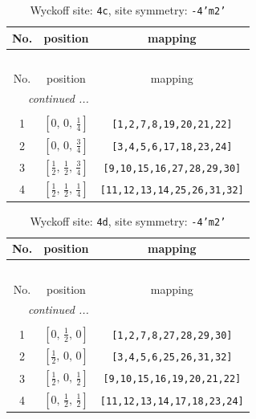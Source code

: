 \documentclass[fleqn,8pt]{jsarticle}
\begin{document}
\renewcommand{\arraystretch}{1.2}
\begin{longtable}{ccc}
\caption{Wyckoff site: {\tt 4c}, site symmetry: {\tt -4'm2'}}
 \\
 \hline \hline
No. & position & mapping \\ \hline \endfirsthead

\multicolumn{2}{l}{\tablename\ \thetable{}} \\
 \hline \hline
No. & position & mapping \\ \hline \endhead

 \hline \hline
\multicolumn{2}{r}{\footnotesize\it continued ...} \\ \endfoot

 \hline \hline
\multicolumn{2}{r}{} \\ \endlastfoot

1 & $\left[ 0,\, 0,\, \frac{1}{4} \right]$ & {\tt [1,2,7,8,19,20,21,22]} \\ \hline
2 & $\left[ 0,\, 0,\, \frac{3}{4} \right]$ & {\tt [3,4,5,6,17,18,23,24]} \\ \hline
3 & $\left[ \frac{1}{2},\, \frac{1}{2},\, \frac{3}{4} \right]$ & {\tt [9,10,15,16,27,28,29,30]} \\ \hline
4 & $\left[ \frac{1}{2},\, \frac{1}{2},\, \frac{1}{4} \right]$ & {\tt [11,12,13,14,25,26,31,32]} \\
\end{longtable}
\renewcommand{\arraystretch}{1.2}
\begin{longtable}{ccc}
\caption{Wyckoff site: {\tt 4d}, site symmetry: {\tt -4'm2'}}
 \\
 \hline \hline
No. & position & mapping \\ \hline \endfirsthead

\multicolumn{2}{l}{\tablename\ \thetable{}} \\
 \hline \hline
No. & position & mapping \\ \hline \endhead

 \hline \hline
\multicolumn{2}{r}{\footnotesize\it continued ...} \\ \endfoot

 \hline \hline
\multicolumn{2}{r}{} \\ \endlastfoot

1 & $\left[ 0,\, \frac{1}{2},\, 0 \right]$ & {\tt [1,2,7,8,27,28,29,30]} \\ \hline
2 & $\left[ \frac{1}{2},\, 0,\, 0 \right]$ & {\tt [3,4,5,6,25,26,31,32]} \\ \hline
3 & $\left[ \frac{1}{2},\, 0,\, \frac{1}{2} \right]$ & {\tt [9,10,15,16,19,20,21,22]} \\ \hline
4 & $\left[ 0,\, \frac{1}{2},\, \frac{1}{2} \right]$ & {\tt [11,12,13,14,17,18,23,24]} \\
\end{longtable}
\end{document}
